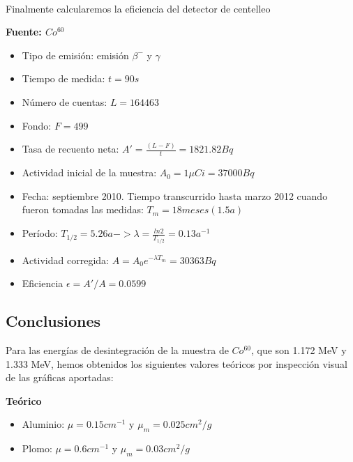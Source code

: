 \documentclass[11pt]{article}
\begin{document}
    \begin{center}
    \end{center}
    { \hspace*{\fill} \\}
    
    Finalmente calcularemos la eficiencia del detector de centelleo

    \textbf{Fuente: \(Co^{60}\)}

\begin{itemize}
\item
  Tipo de emisión: emisión \(\beta^{-}\) y \(\gamma\)
\item
  Tiempo de medida: \(t=90s\)
\item
  Número de cuentas: \(L=164463\)
\item
  Fondo: \(F = 499\)
\item
  Tasa de recuento neta: \(A'= \frac{(L-F)}{t} = 1821.82 Bq\)
\item
  Actividad inicial de la muestra: \(A_0 = 1 \mu Ci = 37000 Bq\)
\item
  Fecha: septiembre 2010. Tiempo transcurrido hasta marzo 2012 cuando
  fueron tomadas las medidas: \(T_m = 18 meses (1.5 a)\)
\item
  Período:
  \(T_{1/2} = 5.26 a -> \lambda = \frac{ln2}{T_{1/2}} = 0.13 a^{-1}\)
\item
  Actividad corregida: \(A = A_0e^{- \lambda T_m} = 30363 Bq\)
\item
  Eficiencia \(\epsilon = A'/A = 0.0599\)
\end{itemize}

    \hypertarget{conclusiones}{%
\subsection{Conclusiones}\label{conclusiones}}

Para las energías de desintegración de la muestra de \(Co^{60}\), que
son 1.172 MeV y 1.333 MeV, hemos obtenidos los siguientes valores
teóricos por inspección visual de las gráficas aportadas:

\textbf{Teórico}

\begin{itemize}
\item
  Aluminio: \(\mu = 0.15cm^{-1}\) y \(\mu_m = 0.025 cm^2/g\)
\item
  Plomo: \(\mu = 0.6 cm^{-1}\) y \(\mu_m = 0.03 cm^2/g\)
\end{itemize}
\end{document}
